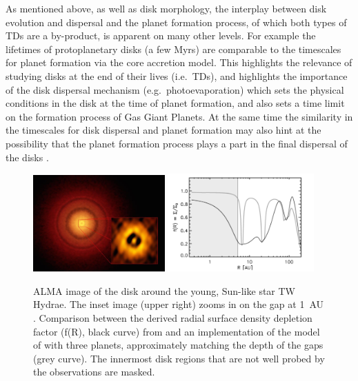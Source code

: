 \documentclass[10pt,fleqn,twoside]{article}
\begin{document}
As mentioned above, as well as disk morphology, the interplay between disk evolution and
dispersal and the planet formation process, of which both types of TDs
are a
by-product, is apparent on many other
 levels. For example the lifetimes of protoplanetary disks (a few
Myrs) are comparable to the timescales for planet formation via the core
accretion model. This highlights the relevance of studying disks at the end
of their lives (i.e.\ TDs), and highlights the importance
of the disk dispersal mechanism (e.g.\ photoevaporation) which sets the
physical conditions in the disk at the time of planet formation, and
also sets a time limit on the formation process of Gas Giant Planets. 
At the same time the similarity in the timescales for disk dispersal
and planet formation may also hint at the possibility that the planet
formation process plays a part in the final dispersal of the disks
\citep[e.g.][]{2013MNRAS.430.1392R, 2015MNRAS.454.2173R}.


\begin{figure}
\centerline{\includegraphics[width=0.45\textwidth]{figures/twhya.jpg}
\includegraphics[width=0.5\textwidth]{figures/vanboekel.pdf}}
\caption{ ALMA image of the disk around the young,
  Sun-like star TW Hydrae. The inset image (upper right) zooms in on
  the gap at 1~AU .  Comparison between the derived radial surface density
depletion factor (f(R), black curve) from \citet{2016arXiv161008939V} and an implementation
of the model of \citet{2015ApJ...807L..11D} with three planets, approximately
matching the depth of the gaps (grey curve). The innermost disk
regions that are not well probed by the observations are masked. } 
\label{fig:twhya}
\end{figure}
\end{document}
